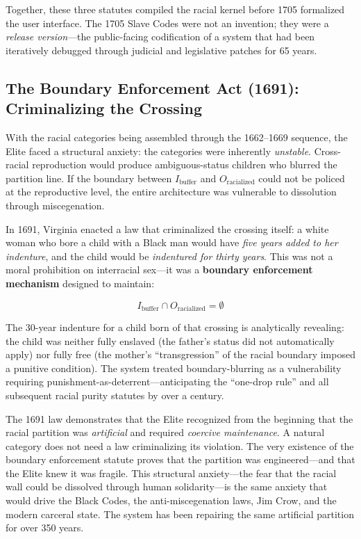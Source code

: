 \documentclass[12pt,openany]{book}
\begin{document}
Together, these three statutes compiled the racial kernel before 1705 formalized the user interface. The 1705 Slave Codes were not an invention; they were a \textit{release version}---the public-facing codification of a system that had been iteratively debugged through judicial and legislative patches for 65 years.

\subsection{The Boundary Enforcement Act (1691): Criminalizing the Crossing}

With the racial categories being assembled through the 1662--1669 sequence, the Elite faced a structural anxiety: the categories were inherently \textit{unstable}. Cross-racial reproduction would produce ambiguous-status children who blurred the partition line. If the boundary between $I_{\text{buffer}}$ and $O_{\text{racialized}}$ could not be policed at the reproductive level, the entire architecture was vulnerable to dissolution through miscegenation.

In 1691, Virginia enacted a law that criminalized the crossing itself: a white woman who bore a child with a Black man would have \textit{five years added to her indenture}, and the child would be \textit{indentured for thirty years}. This was not a moral prohibition on interracial sex---it was a \textbf{boundary enforcement mechanism} designed to maintain:

\[
I_{\text{buffer}} \cap O_{\text{racialized}} = \emptyset
\]

The 30-year indenture for a child born of that crossing is analytically revealing: the child was neither fully enslaved (the father's status did not automatically apply) nor fully free (the mother's ``transgression'' of the racial boundary imposed a punitive condition). The system treated boundary-blurring as a vulnerability requiring punishment-as-deterrent---anticipating the ``one-drop rule'' and all subsequent racial purity statutes by over a century.

The 1691 law demonstrates that the Elite recognized from the beginning that the racial partition was \textit{artificial} and required \textit{coercive maintenance}. A natural category does not need a law criminalizing its violation. The very existence of the boundary enforcement statute proves that the partition was engineered---and that the Elite knew it was fragile. This structural anxiety---the fear that the racial wall could be dissolved through human solidarity---is the same anxiety that would drive the Black Codes, the anti-miscegenation laws, Jim Crow, and the modern carceral state. The system has been repairing the same artificial partition for over 350 years.
\end{document}
